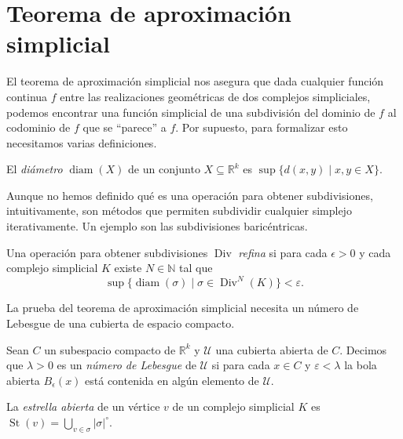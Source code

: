 \documentclass{standalone}
\begin{document}
	\section{Teorema de aproximación simplicial}
	
	El teorema de aproximación simplicial nos asegura que dada cualquier función continua $f$ entre las realizaciones geométricas de dos complejos simpliciales,  podemos encontrar una función simplicial de una subdivisión del dominio de $f$ al codominio de $f$ que se ``parece'' a $f$. Por supuesto, para formalizar esto necesitamos varias definiciones.
	
	\begin{definition}\label{def:diameter}
		El \emph{diámetro} $\operatorname{diam}(X)$ de un conjunto $X\subseteq\mathbb{R}^{k}$ es $\sup\{d(x,y)\mid x,y\in X\}$.
	\end{definition}
	
	Aunque no hemos definido qué es una operación para obtener subdivisiones, intuitivamente, son métodos que permiten subdividir cualquier simplejo iterativamente. Un ejemplo son las subdivisiones baricéntricas.
	
	\begin{definition}\label{def:mesh}
		Una operación para obtener subdivisiones $\operatorname{Div}$ \emph{refina} si para cada $\epsilon>0$ y cada complejo simplicial $K$ existe $N\in\mathbb{N}$ tal que \[\sup\{\operatorname{diam}(\sigma)\mid\sigma\in\operatorname{Div}^{N}(K)\}<\varepsilon.\]
	\end{definition}
	La prueba del teorema de aproximación simplicial necesita un número de Lebesgue de una cubierta de espacio compacto.
	
	\begin{definition}\label{def:lebesgue}
		Sean $C$ un subespacio compacto de $\mathbb{R}^{k}$ y $\mathcal{U}$ una cubierta abierta de $C$. Decimos que $\lambda>0$ es un \emph{número de Lebesgue} de $\mathcal{U}$ si para cada $x\in C$ y $\varepsilon<\lambda$ la bola abierta $B_{\epsilon}(x)$ está contenida en algún elemento de $\mathcal{U}$.
	\end{definition}
	
	\begin{definition}
		La \emph{estrella abierta} de un vértice $v$ de un complejo simplicial $K$ es $\operatorname{St}(v)=\bigcup_{v\in\sigma}|\sigma|^{\circ}$.
	\end{definition}
	
\end{document}
